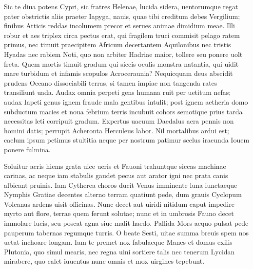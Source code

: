 \documentclass{book}
\newenvironment {carmen} [1] [\relax] 
  {\Titulus \Versus \incipit*\numerus{1}#1}
  {\endVersus}
\newcommand {\GlycAscl}  {\Forma \strophae {2 \poena 0}}
\newcommand {\ArchIV}    {\Forma \strophae {0 \poena 3}}
\begin{document}
\begin{carmen}[\GlycAscl]
      Sic te diua potens Cypri,
 sic fratres Helenae, lucida sidera,
      uentorumque regat pater
 obstrictis aliis praeter Iapyga,
       nauis, quae tibi creditum               
 debes Vergilium; finibus Atticis
      reddas incolumem precor
 et serues animae dimidium meae.
      Illi robur et aes triplex
 circa pectus erat, qui fragilem truci               
      commisit pelago ratem
 primus, nec timuit praecipitem Africum
      decertantem Aquilonibus
 nec tristis Hyadas nec rabiem Noti,
       quo non arbiter Hadriae               
 maior, tollere seu ponere uolt freta.
      Quem mortis timuit gradum
 qui siccis oculis monstra natantia,
      qui uidit mare turbidum et
 infamis scopulos Acroceraunia?               
      Nequicquam deus abscidit
 prudens Oceano dissociabili
      terras, si tamen impiae
 non tangenda rates transiliunt uada.
       Audax omnia perpeti               
 gens humana ruit per uetitum nefas;
      audax Iapeti genus
 ignem fraude mala gentibus intulit;
      post ignem aetheria domo
 subductum macies et noua febrium               
      terris incubuit cohors
 semotique prius tarda necessitas
      leti corripuit gradum.
 Expertus uacuum Daedalus aera
       pennis non homini datis;               
 perrupit Acheronta Herculeus labor.
      Nil mortalibus ardui est;
 caelum ipsum petimus stultitia neque
      per nostrum patimur scelus
 iracunda Iouem ponere fulmina.                

\end{carmen}

\begin{carmen}[\ArchIV]

 Soluitur acris hiems grata uice ueris et Fauoni
      trahuntque siccas machinae carinas,
 ac neque iam stabulis gaudet pecus aut arator igni
      nec prata canis albicant pruinis.
 Iam Cytherea choros ducit Venus imminente luna               
      iunctaeque Nymphis Gratiae decentes
 alterno terram quatiunt pede, dum grauis Cyclopum
      Volcanus ardens uisit officinas.
 Nunc decet aut uiridi nitidum caput impedire myrto
       aut flore, terrae quem ferunt solutae;               
 nunc et in umbrosis Fauno decet immolare lucis,
      seu poscat agna siue malit haedo.
 Pallida Mors aequo pulsat pede pauperum tabernas
      regumque turris. O beate Sesti,
 uitae summa breuis spem nos uetat inchoare longam.               
      Iam te premet nox fabulaeque Manes
 et domus exilis Plutonia, quo simul mearis,
      nec regna uini sortiere talis
 nec tenerum Lycidan mirabere, quo calet iuuentus
       nunc omnis et mox uirgines tepebunt.                

\end{carmen}
\end{document}
